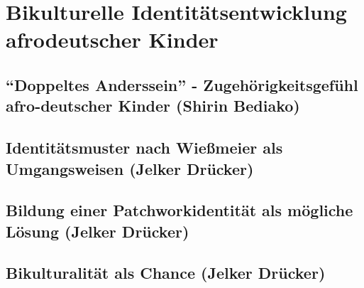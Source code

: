 \chapter{Bikulturelle Identitätsentwicklung afrodeutscher Kinder}\label{sec:4}
  \section{\enquote{Doppeltes Anderssein} -  Zugehörigkeitsgefühl afro-deutscher Kinder (Shirin Bediako)}\label{sec:4_1}
    \begin{flushleft}
    \end{flushleft}

    \begin{flushleft}
    \end{flushleft}


  \section{Identitätsmuster nach Wießmeier als Umgangsweisen (Jelker Drücker)}\label{sec:4_2}
    \begin{flushleft}
    \end{flushleft}

    \begin{flushleft}
    \end{flushleft}

  
  \section{Bildung einer Patchworkidentität als mögliche Lösung (Jelker Drücker)}\label{sec:4_3}
    \begin{flushleft}
    \end{flushleft}

  \section{Bikulturalität als Chance (Jelker Drücker)}\label{sec:4_4}
    \begin{flushleft}
    \end{flushleft}

